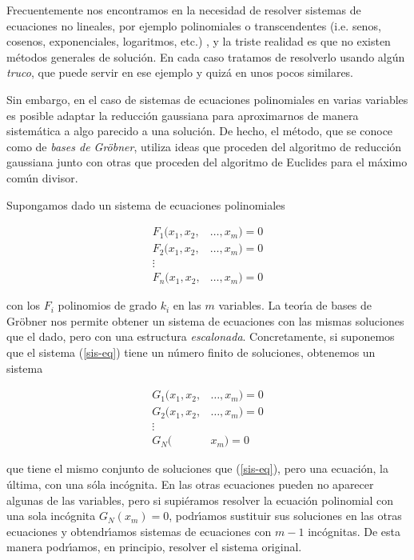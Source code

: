 Frecuentemente nos encontramos en la necesidad de resolver sistemas de 
ecuaciones no lineales, por ejemplo polinomiales o transcendentes (i.e. senos, 
cosenos, exponenciales, logaritmos, etc.) , y la triste realidad es que {\sc no 
existen m\'etodos generales de soluci\'on}. En cada caso tratamos de resolverlo 
usando alg\'un {\itshape truco}, que puede servir en ese ejemplo y quiz\'a en 
unos pocos similares. 

Sin embargo, en el caso de sistemas de ecuaciones polinomiales en varias 
variables es posible adaptar la reducci\'on gaussiana para aproximarnos de 
manera sistem\'atica a algo parecido a una soluci\'on. De hecho, el m\'etodo, 
que se conoce como  de {\itshape bases de Gr\"obner}, utiliza ideas que 
proceden del algoritmo de reducci\'on gaussiana junto con otras que proceden 
del algoritmo de Euclides para el m\'aximo com\'un divisor.  

Supongamos dado un sistema de ecuaciones polinomiales

 \begin{align*}\label{sis-eq}
  F_1(x_1,x_2,&\dots,x_m)=0\\
  F_2(x_1,x_2,&\dots,x_m)=0\\
  \vdots &  \\
  F_n(x_1,x_2,&\dots,x_m)=0
 \end{align*}

\noindent con los $F_i$ polinomios de grado $k_i$ en las $m$ variables. La 
teor\'{\i}a de  bases de Gr\"obner nos permite obtener un sistema de ecuaciones 
con las mismas soluciones que el dado, pero con una estructura {\itshape 
escalonada}. Concretamente, si suponemos que el sistema (\ref{sis-eq}) tiene un 
n\'umero finito de soluciones, obtenemos un sistema 

\begin{align*}%
  G_1(x_1,x_2,&\dots,x_m)=0\\
  G_2(x_1,x_2,&\dots,x_m)=0\\
  \vdots &  \\
  G_N(&x_m)=0
 \end{align*}

\noindent que tiene el mismo conjunto de soluciones que (\ref{sis-eq}), pero 
una ecuaci\'on, la \'ultima, con una s\'ola inc\'ognita. En las otras 
ecuaciones pueden no aparecer algunas de las variables, pero si {\sc 
supi\'eramos resolver} la ecuaci\'on polinomial con una sola inc\'ognita 
$G_N(x_m)=0$, podr\'{\i}amos sustituir sus soluciones en las otras ecuaciones y 
obtendr\'{\i}amos  sistemas de ecuaciones con $m-1$ inc\'ognitas. De esta 
manera 
podr\'{\i}amos, en principio, resolver el sistema original. 

